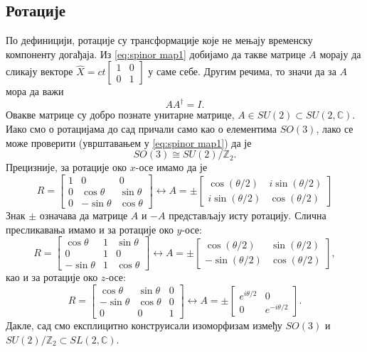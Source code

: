\documentclass{report}
\theoremstyle{plain}
\theoremstyle{definition}
\begin{document}
\subsection*{Ротације}
По дефиницији, ротације су трансформације које не мењају временску компоненту догађаја. Из \eqref{eq:spinor map1} добијамо да такве матрице $A$ морају да сликају векторе $\hat X = ct\begin{bmatrix} 1 & 0\\ 0 & 1 \end{bmatrix}$ у саме себе. Другим речима, то значи да за $A$ мора да важи $$AA^\dag = I.$$
Овакве матрице су добро познате унитарне матрице, $A\in SU(2)\subset SU(2, \mathbb{C})$. Иако смо о ротацијама до сад причали само као о елементима $SO(3)$, лако се може проверити (уврштавањем у \eqref{eq:spinor map1}) да је
$$SO(3)\cong SU(2)/\mathbb{Z}_2.$$
Прецизније, за ротације око $x$-осе имамо да је
$$R = \begin{bmatrix}
        1 & 0 & 0\\
        0 & \cos\theta & \sin\theta \\
        0 & -\sin\theta & \cos\theta
      \end{bmatrix} \leftrightarrow
  A = \pm \begin{bmatrix}
    \cos(\theta/2) & i\sin(\theta/2) \\
    i\sin(\theta/2) & \cos(\theta/2)
  \end{bmatrix}
$$
Знак $\pm$ означава да матрице $A$ и $-A$ представљају исту ротацију. Слична пресликавања имамо и за ротације око $y$-осе:
$$R = \begin{bmatrix}
        \cos \theta & 1 & \sin\theta\\
        0 & 1 & 0 \\
        -\sin\theta & 1 & \cos\theta
      \end{bmatrix} \leftrightarrow
  A = \pm \begin{bmatrix}
    \cos(\theta/2) & \sin(\theta/2) \\
    -\sin(\theta/2) & \cos(\theta/2)
  \end{bmatrix},
$$
као и за ротације око $z$-осе:
$$R = \begin{bmatrix}
        \cos\theta & \sin\theta & 0 \\
        -\sin\theta & \cos\theta & 0 \\
        0 & 0 & 1
      \end{bmatrix} \leftrightarrow
  A = \pm \begin{bmatrix}
    e^{i\theta/2} & 0 \\
    0 & e^{-i\theta/2}
  \end{bmatrix}.
$$
Дакле, сад смо експлицитно конструисали изоморфизам између $SO(3)$ и $SU(2)/\mathbb{Z}_2 \subset SL(2, \mathbb{C})$.
\end{document}
